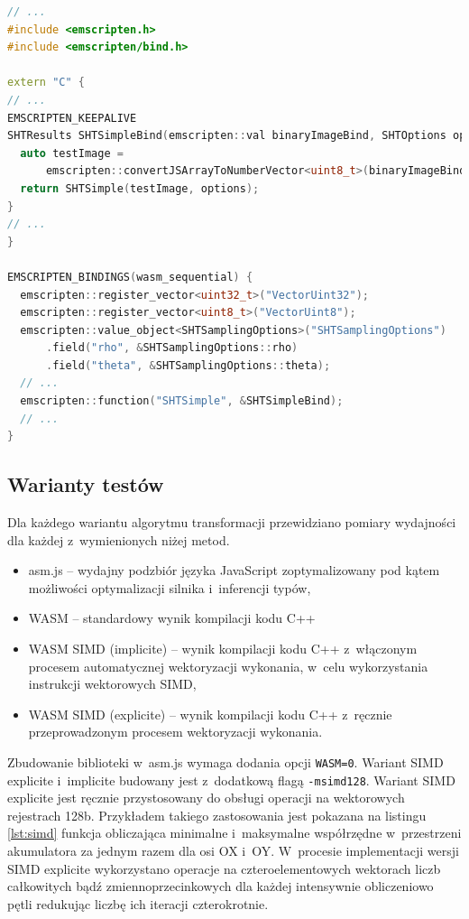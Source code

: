 \begin{lstlisting}[language=C++, float=ht, label=lst:wasm-bind, caption=Wybrane fragmenty kodu warstwy powiązania WASM pomiędzy C++ i~JavaScript.]
// ...
#include <emscripten.h>
#include <emscripten/bind.h>

extern "C" {
// ...
EMSCRIPTEN_KEEPALIVE
SHTResults SHTSimpleBind(emscripten::val binaryImageBind, SHTOptions options) {
  auto testImage =
      emscripten::convertJSArrayToNumberVector<uint8_t>(binaryImageBind);
  return SHTSimple(testImage, options);
}
// ...
}

EMSCRIPTEN_BINDINGS(wasm_sequential) {
  emscripten::register_vector<uint32_t>("VectorUint32");
  emscripten::register_vector<uint8_t>("VectorUint8");
  emscripten::value_object<SHTSamplingOptions>("SHTSamplingOptions")
      .field("rho", &SHTSamplingOptions::rho)
      .field("theta", &SHTSamplingOptions::theta);
  // ...
  emscripten::function("SHTSimple", &SHTSimpleBind);
  // ...
}
\end{lstlisting}

\subsection{Warianty testów}

Dla każdego wariantu algorytmu transformacji przewidziano pomiary wydajności dla każdej z~wymienionych niżej metod.

\begin{itemize}
    \item asm.js -- wydajny podzbiór języka JavaScript zoptymalizowany pod kątem możliwości optymalizacji silnika i~inferencji typów,
    \item WASM -- standardowy wynik kompilacji kodu C++
    \item WASM SIMD (implicite) -- wynik kompilacji kodu C++ z~włączonym procesem automatycznej wektoryzacji wykonania, w~celu wykorzystania instrukcji wektorowych SIMD,
    \item WASM SIMD (explicite) -- wynik kompilacji kodu C++ z~ręcznie przeprowadzonym procesem wektoryzacji wykonania.
\end{itemize}

Zbudowanie biblioteki w~asm.js wymaga dodania opcji \lstinline{WASM=0}. Wariant SIMD explicite i~implicite budowany jest z~dodatkową flagą \lstinline{-msimd128}. Wariant SIMD explicite jest ręcznie przystosowany do obsługi operacji na wektorowych rejestrach 128b. Przykładem takiego zastosowania jest pokazana na listingu \ref{lst:simd} funkcja obliczająca minimalne i~maksymalne współrzędne w~przestrzeni akumulatora za jednym razem dla osi OX i~OY. W~procesie implementacji wersji SIMD explicite wykorzystano operacje na czteroelementowych wektorach liczb całkowitych bądź zmiennoprzecinkowych dla każdej intensywnie obliczeniowo pętli redukując liczbę ich iteracji czterokrotnie.

